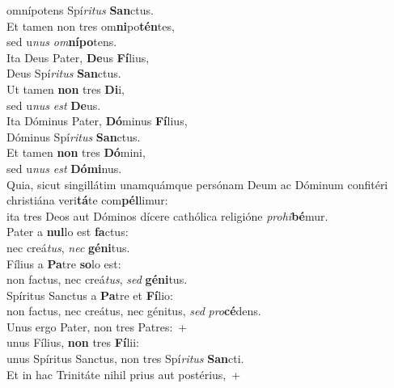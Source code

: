 \oddverse omnípotens Spí\textit{ri}\textit{tus} \textbf{San}ctus.\\
\evenverse Et tamen non tres om\textbf{ni}po\textbf{tén}tes,~\*\\
\evenverse sed u\textit{nus} \textit{om}\textbf{ní}\textbf{po}tens.\\
\oddverse Ita Deus Pater, \textbf{De}us \textbf{Fí}lius,~\*\\
\oddverse Deus Spí\textit{ri}\textit{tus} \textbf{San}ctus.\\
\evenverse Ut tamen \textbf{non} tres \textbf{Di}i,~\*\\
\evenverse sed u\textit{nus} \textit{est} \textbf{De}us.\\
\oddverse Ita Dóminus Pater, \textbf{Dó}minus \textbf{Fí}lius,~\*\\
\oddverse Dóminus Spí\textit{ri}\textit{tus} \textbf{San}ctus.\\
\evenverse Et tamen \textbf{non} tres \textbf{Dó}mini,~\*\\
\evenverse sed u\textit{nus} \textit{est} \textbf{Dó}\textbf{mi}nus.\\
\oddverse Quia, sicut singillátim unamquámque persónam Deum ac Dóminum confitéri christiána veri\textbf{tá}te com\textbf{pél}limur:~\*\\
\oddverse ita tres Deos aut Dóminos dícere cathólica religióne \textit{pro}\textit{hi}\textbf{bé}mur.\\
\evenverse Pater a \textbf{nul}lo est \textbf{fa}ctus:~\*\\
\evenverse nec creá\textit{tus}, \textit{nec} \textbf{gé}\textbf{ni}tus.\\
\oddverse Fílius a \textbf{Pa}tre \textbf{so}lo est:~\*\\
\oddverse non factus, nec creá\textit{tus}, \textit{sed} \textbf{gé}\textbf{ni}tus.\\
\evenverse Spíritus Sanctus a \textbf{Pa}tre et \textbf{Fí}lio:~\*\\
\evenverse non factus, nec creátus, nec génitus, \textit{sed} \textit{pro}\textbf{cé}dens.\\
\oddverse Unus ergo Pater, non tres Patres:~+\\
\oddverse  unus Fílius, \textbf{non} tres \textbf{Fí}lii:~\*\\
\oddverse unus Spíritus Sanctus, non tres Spí\textit{ri}\textit{tus} \textbf{San}cti.\\
\evenverse Et in hac Trinitáte nihil prius aut postérius,~+\\
